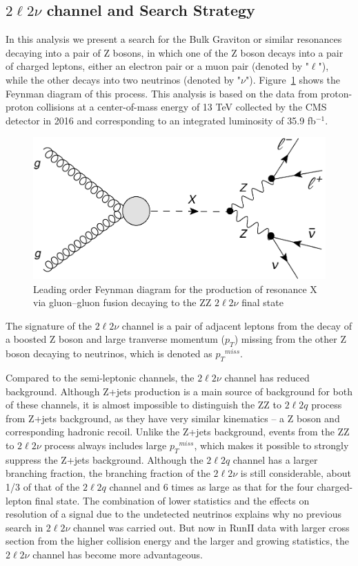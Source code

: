 \subsection{$2\ell 2\nu$ channel and  Search Strategy}
In this analysis we present a search for the Bulk Graviton or similar resonances decaying into a pair of Z bosons, in which one of the Z boson decays into a pair of charged leptons, either an electron pair or a muon pair (denoted by "$\ell$"), while the other decays into two neutrinos (denoted by "$\nu$"). Figure~\ref{fig:intro_llnndiagram} shows the Feynman diagram of this process. This analysis is based on the data from proton-proton collisions at a center-of-mass energy of 13 TeV collected by the CMS detector in 2016 and corresponding to an integrated luminosity of 35.9 fb$^{-1}$. 
\begin{figure}[htbp]
\begin{center}
\includegraphics[width=0.72\linewidth]{figures/intro_llnndiagram.pdf}
\caption{Leading order Feynman diagram for the production of resonance X via gluon–gluon fusion decaying to the ZZ $2\ell 2\nu$ final state}
\label{fig:intro_llnndiagram}
\end{center}
\end{figure}
The signature of the  $2\ell 2\nu$ channel is a pair of adjacent leptons from the decay of a boosted Z boson and large tranverse momentum ($p_{T}$) missing from the other Z boson decaying to neutrinos, which is denoted as ${p_{T}}^{miss}$.

\vspace{0.3cm}
Compared to the semi-leptonic channels, the $2\ell 2\nu$ channel has reduced background. Although Z+jets production is a main source of background for both of these channels, it is almost impossible to distinguish the ZZ to $2\ell 2q$ process from Z+jets background, as they have very similar kinematics -- a Z boson and corresponding hadronic recoil. Unlike the Z+jets background, events from the ZZ to $2\ell 2\nu$ process always includes large ${p_{T}}^{miss}$, which makes it possible to strongly suppress the Z+jets background. Although the $2\ell 2q$ channel has a larger branching fraction, the branching fraction of the $2\ell 2\nu$ is still considerable, about 1/3 of that of the $2\ell 2q$ channel and 6 times as large as that for the four charged-lepton final state. The combination of lower statistics and the effects on resolution of a signal due to the undetected neutrinos explains why no previous search in $2\ell 2\nu$ channel was carried out. But now in RunII data with larger cross section from the higher collision energy and the larger and growing statistics, the $2\ell 2\nu$ channel has become more advantageous.

